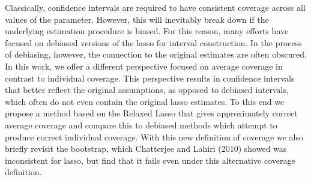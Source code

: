 Classically, confidence intervals are required to have consistent coverage across all values of the parameter. However, this will inevitably break down if the underlying estimation procedure is biased. For this reason, many efforts have focused on debiased versions of the lasso for interval construction. In the process of debiasing, however, the connection to the original estimates are often obscured. In this work, we offer a different perspective focused on average coverage in contrast to individual coverage. This perspective results in confidence intervals that better reflect the original assumptions, as opposed to debiased intervals, which often do not even contain the original lasso estimates. To this end we propose a method based on the Relaxed Lasso that gives approximately correct average coverage and compare this to debiased methods which attempt to produce correct individual coverage. With this new definition of coverage we also briefly revisit the bootstrap, which Chatterjee and Lahiri (2010) showed was inconsistent for lasso, but find that it fails even under this alternative coverage definition.
